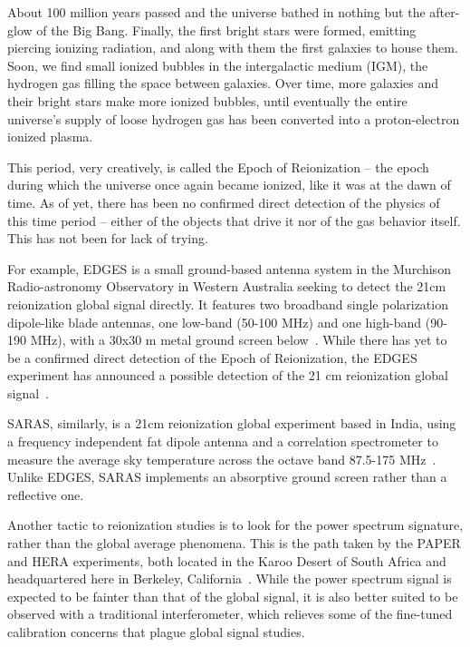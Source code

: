 About 100 million years passed and the universe bathed in nothing but the 
after-glow of the Big Bang. Finally, the first bright stars were formed, 
emitting piercing ionizing radiation, and along with them the first galaxies to 
house them.  Soon, we find small ionized bubbles in the intergalactic medium 
(IGM), the hydrogen gas filling the space between galaxies. Over time, more 
galaxies and their bright stars make more ionized bubbles, until eventually the 
entire universe's supply of loose hydrogen gas has been converted into a 
proton-electron ionized plasma.

This period, very creatively, is called the Epoch of Reionization -- the epoch 
during which the universe once again became ionized, like it was at the dawn of 
time. As of yet, there has been no confirmed direct detection of the physics of 
this time period -- either of the objects that drive it nor of the gas behavior 
itself.  This has not been for lack of trying. 

For example, EDGES is a small ground-based antenna system in the Murchison 
Radio-astronomy Observatory in Western Australia seeking to detect the 21cm 
reionization global signal directly.  It features two broadband single 
polarization dipole-like blade antennas, one low-band (50-100 MHz) and one 
high-band (90-190 MHz), with a 30x30 m metal ground screen 
below~\citep{monsalve2017}. While there has yet to be a confirmed direct 
detection of the Epoch of Reionization, the EDGES experiment has announced a 
possible detection of the 21 cm reionization global signal~\citep{bowman2018}.

SARAS, similarly, is a 21cm reionization global experiment based in India, 
using a frequency independent fat dipole antenna and a correlation spectrometer 
to measure the average sky temperature across the octave band 87.5-175 
MHz~\citep{patra2013}.  Unlike EDGES, SARAS implements an absorptive ground 
screen rather than a reflective one.

Another tactic to reionization studies is to look for the power spectrum 
signature, rather than the global average phenomena. This is the path taken by 
the PAPER and HERA experiments, both located in the Karoo Desert of South 
Africa and headquartered here in Berkeley, California~\citep{deboer2017}. While 
the power spectrum signal is expected to be fainter than that of the global 
signal, it is also better suited to be observed with a traditional 
interferometer, which relieves some of the fine-tuned calibration concerns that 
plague global signal studies. 

